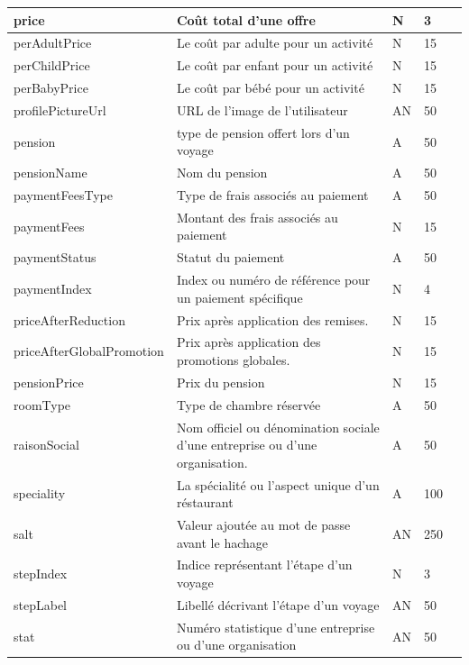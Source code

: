 \documentclass[12pt]{report}
\begin{document}
\begin{longtable}{|p{2cm}|p{4cm}|p{2cm}|p{2cm}|p{4cm}|}
						\hline
						price & Coût total d'une  offre & N & 3 &\\
						\hline
						perAdultPrice & Le coût par adulte pour un activité & N & 15 & \\
						\hline
						perChildPrice & Le coût par enfant pour un activité & N &15 &\\
						\hline
						perBabyPrice & Le coût par bébé pour un activité & N &15 & \\
						\hline
						profilePictureUrl & URL de l'image de l’utilisateur & AN & 50 &\\
						\hline
						pension & type de pension offert lors d'un voyage & A & 50 & \\
						\hline
						pensionName& Nom du pension & A & 50 &\\
						\hline
						paymentFeesType & Type de frais associés au paiement &A&50&\\
						\hline
						paymentFees &  Montant des frais associés au paiement & N &15 &\\
						\hline
						paymentStatus & Statut du paiement& A & 50&\\
						\hline
						paymentIndex & Index ou numéro de référence pour un paiement spécifique&N&4&\\
						\hline
						priceAfterReduction & Prix après application des remises. & N & 15 & \\
						\hline
						priceAfterGlobalPromotion & Prix après application des promotions globales. & N &15&\\
						\hline
						pensionPrice & Prix du pension & N & 15 & \\
						\hline
						roomType & Type de chambre réservée & A & 50&\\
						\hline
						raisonSocial & Nom officiel ou dénomination sociale d'une entreprise ou d'une organisation. & A & 50& \\
						\hline
						speciality & La spécialité ou l'aspect unique d'un réstaurant & A & 100&\\
						\hline
						salt  & Valeur ajoutée au mot de passe avant le hachage & AN & 250 & \\
						\hline
						stepIndex & Indice représentant l'étape d'un voyage & N & 3 &\\
						\hline
						stepLabel & Libellé décrivant l'étape d'un voyage & AN & 50 &\\
						\hline
						stat & Numéro statistique d'une entreprise ou d'une organisation & AN &50&\\

\end{longtable}
\end{document}
